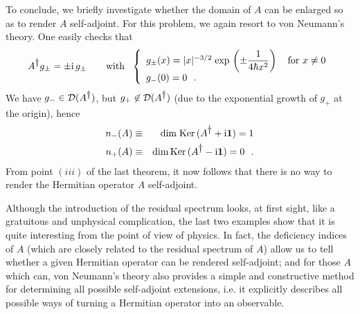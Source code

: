 \documentclass[a4wide,12pt]{report}
\begin{document}
 To conclude, we briefly investigate whether    
 the domain of $A$ can be enlarged 
 so as to render $A$ self-adjoint. 
 For this problem, we again resort to von Neumann's theory. 
One easily checks that 
\[
A^{\dag} g_{\pm} = \pm \ri \, g_{\pm}
\qquad {\rm with} \ \
\left\{
\begin{array}{l}
g_{\pm} (x) =
|x|^{-3/2} \; {\rm exp} \, \left( \pm \ds{1 \over 4 \hbar x^2}
\right)  \quad {\rm for} \ x \neq 0 \\
g_- (0) = 0 \  \ .
\end{array}
\right.
\]
We have 
$g_- \in {\cal D} (A^{\dag} )$, but 
$g_+ \not\in {\cal D} (A^{\dag} )$ (due to the exponential growth of  
$g_+$ at the origin), hence 
\begin{eqnarray*}
n_- (A) & \equiv & {\rm dim \; Ker} \,
(A^{\dag} + \ri {\bf 1}) =1
\\
n_+ (A) & \equiv & {\rm dim \, Ker} \,
(A^{\dag} - \ri {\bf 1}) = 0
\ \ .
\end{eqnarray*}
From point $(iii)$ of the last theorem,
it now follows that there is no way to render the Hermitian
operator $A$ self-adjoint.

\medskip 
 
 Although the introduction of the residual spectrum looks,
 at first sight, like a 
 gratuitous and unphysical complication, the last two examples
 show that it is quite interesting from the point of view of  physics.
 In fact, 
the deficiency indices of $A$ (which are closely
 related to the residual spectrum of $A$) 
allow us to tell whether a given Hermitian operator 
can be rendered self-adjoint; and for those $A$ which can,
von Neumann's theory also  
provides a simple and
 constructive method  for determining 
all possible self-adjoint extensions,  
i.e. it explicitly describes all possible ways of turning 
 a Hermitian operator  into an observable. 
 
\end{document}
